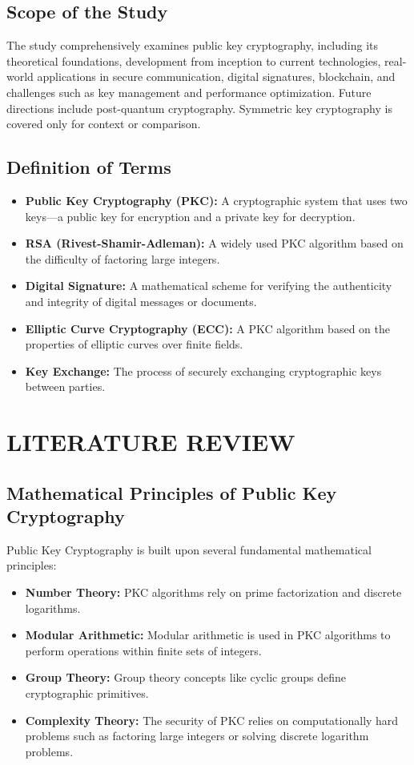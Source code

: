 \documentclass[12pt]{report}
\numberwithin{equation}{chapter}
\begin{document}
\section{Scope of the Study}
The study comprehensively examines public key cryptography, including its theoretical foundations, development from inception to current technologies, real-world applications in secure communication, digital signatures, blockchain, and challenges such as key management and performance optimization. Future directions include post-quantum cryptography. Symmetric key cryptography is covered only for context or comparison.

\section{Definition of Terms}
\begin{itemize}
    \item \textbf{Public Key Cryptography (PKC):} A cryptographic system that uses two keys—a public key for encryption and a private key for decryption.
    \item \textbf{RSA (Rivest-Shamir-Adleman):} A widely used PKC algorithm based on the difficulty of factoring large integers.
    \item \textbf{Digital Signature:} A mathematical scheme for verifying the authenticity and integrity of digital messages or documents.
    \item \textbf{Elliptic Curve Cryptography (ECC):} A PKC algorithm based on the properties of elliptic curves over finite fields.
    \item \textbf{Key Exchange:} The process of securely exchanging cryptographic keys between parties.
\end{itemize}








\newpage
{}
\chapter{LITERATURE REVIEW}
\section{Mathematical Principles of Public Key Cryptography}
Public Key Cryptography is built upon several fundamental mathematical principles:
\begin{itemize}
    \item \textbf{Number Theory:} PKC algorithms rely on prime factorization and discrete logarithms.
    \item \textbf{Modular Arithmetic:} Modular arithmetic is used in PKC algorithms to perform operations within finite sets of integers.
    \item \textbf{Group Theory:} Group theory concepts like cyclic groups define cryptographic primitives.
    \item \textbf{Complexity Theory:} The security of PKC relies on computationally hard problems such as factoring large integers or solving discrete logarithm problems.
\end{itemize}
\end{document}
